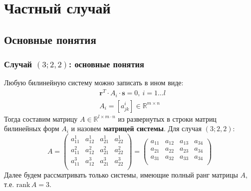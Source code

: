 \documentclass[russian,hyperref={unicode}]{beamer}
\begin{document}
\section{Частный случай}
\subsection{Основные понятия}
\frame
{
	\frametitle{Случай $(3; 2, 2)$: основные понятия}
	Любую билинейную систему можно записать в ином виде: 
	\begin{align*}
	    & \mathbf{r}^T \cdot A_i \cdot \mathbf{s} = 0,~i = 1 \dots l \\
	    & A_i = \left[ a^i_{jk} \right]  \in \mathbb{R}^{m \times n}
	\end{align*}
	Тогда составим матрицу $A \in \mathbb{R}^{l \times m \cdot n}$ из развернутых в 
	строки матриц билинейных форм $A_i$ и назовем \textbf{матрицей системы}. Для случая 
	$(3;2,2)$:
	$$
	A = 
	\begin{pmatrix}
		a^1_{11} & a^1_{12} & a^1_{21} & a^1_{22} \\
		a^2_{11} & a^2_{12} & a^2_{21} & a^2_{22} \\
		a^3_{11} & a^3_{12} & a^3_{21} & a^3_{22} \\
	\end{pmatrix} = 
	\begin{pmatrix}
		a_{11} & a_{12} & a_{13} & a_{34} \\
		a_{21} & a_{22} & a_{23} & a_{34} \\
		a_{31} & a_{32} & a_{33} & a_{34} \\
	\end{pmatrix}
	$$
	Далее будем рассматривать только системы, имеющие полный ранг матрицы $A$, т.е. $
	\text{rank}\,A = 3$. 
}
\end{document}
